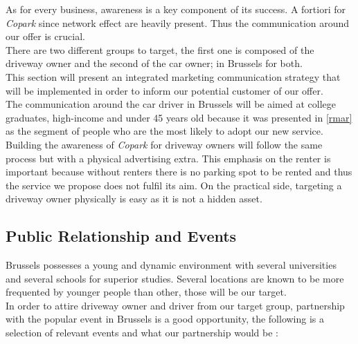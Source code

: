 \documentclass[12pt,a4paper,oneside]{book}
\newcommand{\bp}{\textit{Copark }}
\begin{document}
As for every business, awareness is a key component of its success. A fortiori for \bp since network effect are heavily present. Thus the communication around our offer is crucial.\\
There are two different groups to target, the first one is composed of the driveway owner and the second of the car owner; in Brussels for both.\\
This section will present an integrated marketing communication strategy that will be implemented in order to inform our potential customer of our offer.\\
The communication around the car driver in Brussels will be aimed at college graduates, high-income and under 45 years old because it was presented in \autoref{rmar} as the segment of people who are the most likely to adopt our new service. Building the awareness of \bp for driveway owners will follow the same process but with a physical advertising extra. This emphasis on the renter is important because without renters there is no parking spot to be rented and thus the service we propose does not fulfil its aim. On the practical side, targeting a driveway owner physically is easy as it is not a hidden asset.

\subsection{Public Relationship and Events}
Brussels possesses a young and dynamic environment with several universities and several schools for superior studies. Several locations are known to be more frequented by younger people than other, those will be our target.\\
In order to attire driveway owner and driver from our target group, partnership with the popular event in Brussels is a good opportunity, the following is a selection of relevant events and what our partnership would be :
\end{document}
